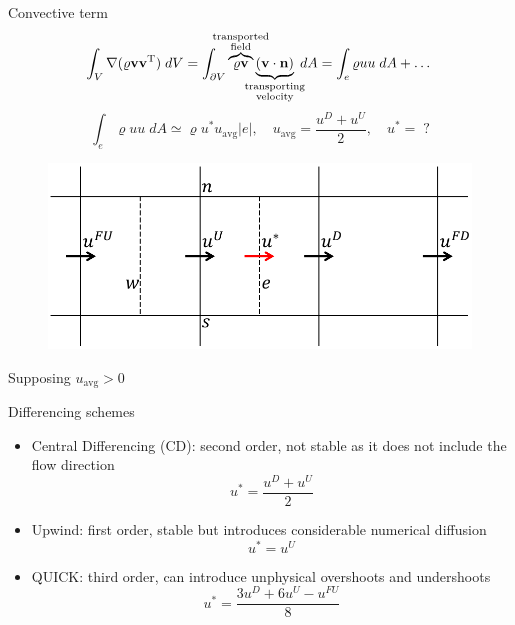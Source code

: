 \documentclass{beamer}
\begin{document}
\begin{frame}{Convective term}
\vspace{-0.5cm}
\begin{equation*}
	\int_V \nabla(\varrho \mathbf{v} \mathbf{v}^\mathrm{T}) \; dV = 
	\int_{\partial V} 
	\overbrace{\varrho\mathbf{v}}^{\substack{\text{\makebox[0pt]{transported}} 
	\\ \text{\makebox[0pt]{field}}}} \underbrace{(\mathbf{v} \cdot 
	\mathbf{n})}_{\substack{\text{\makebox[0pt]{transporting}} \\
	\text{\makebox[0pt]{velocity}}}} \; dA = \int_e \varrho uu \; dA + \dots
\end{equation*}
\begin{equation*}
\int_e \varrho u u \; dA \simeq \varrho u^* u_\text{avg} |e|, \quad 
u_\text{avg} = \frac{u^D + u^U}{2}, \quad u^* = \; ?
\end{equation*}
\begin{minipage}[t]{0.79\textwidth}
\begin{figure}
	\centering
	\includegraphics[height=0.4\textheight]{trecelle_faces.pdf}
\end{figure}
\end{minipage}
\begin{minipage}[t]{0.19\textwidth}
	\vspace*{1cm}
	Supposing $u_\text{avg} > 0$
\end{minipage}
\end{frame}
\begin{frame}{Differencing schemes}
\begin{itemize}
	\item Central Differencing (CD): second order, not stable as it does not 
	include the flow direction
	\begin{equation*}
	u^* = \frac{u^D + u^U}{2}
	\end{equation*}
	\item Upwind: first order, stable but introduces considerable numerical 
	diffusion
	\begin{equation*}
		u^* = u^U
	\end{equation*}
	\item QUICK: third order, can introduce unphysical overshoots and 
	undershoots
	\begin{equation*}
		u^* = \frac{3u^D + 6u^U - u^{FU}}{8}
	\end{equation*}
\end{itemize}
\end{frame}
\end{document}

